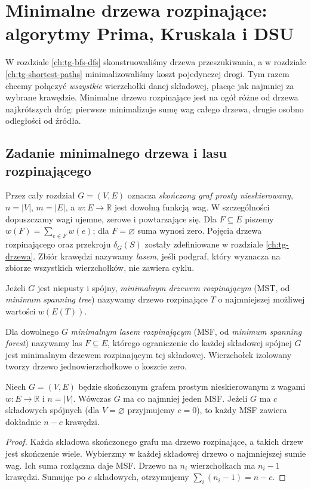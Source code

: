 \chapter{Minimalne drzewa rozpinające: algorytmy Prima, Kruskala i DSU}
\label{ch:tg-mst}

W rozdziale \ref{ch:tg-bfs-dfs} skonstruowaliśmy drzewa
przeszukiwania, a w rozdziale \ref{ch:tg-shortest-paths}
minimalizowaliśmy koszt pojedynczej drogi.
Tym razem chcemy połączyć \emph{wszystkie} wierzchołki
danej składowej, płacąc jak najmniej za wybrane krawędzie.
Minimalne drzewo rozpinające jest na ogół różne od
drzewa najkrótszych dróg: pierwsze minimalizuje sumę
wag całego drzewa, drugie osobno odległości od źródła.

\section{Zadanie minimalnego drzewa i lasu rozpinającego}
\label{sec:tg-mst-model}

Przez cały rozdział $G=(V,E)$ oznacza \emph{skończony
graf prosty nieskierowany}, $n=|V|$, $m=|E|$,
a $w\colon E\to\mathbb R$ jest dowolną funkcją wag.
W szczególności dopuszczamy wagi ujemne, zerowe i powtarzające
się. Dla $F\subseteq E$ piszemy
$w(F)=\sum_{e\in F}w(e)$; dla $F=\varnothing$ suma wynosi zero.
Pojęcia drzewa rozpinającego oraz przekroju $\delta_G(S)$
zostały zdefiniowane w rozdziale \ref{ch:tg-drzewa}.
Zbiór krawędzi nazywamy \emph{lasem}, jeśli podgraf,
który wyznacza na zbiorze wszystkich wierzchołków,
nie zawiera cyklu.

\begin{definicja}
\label{def:tg-mst}
Jeżeli $G$ jest niepusty i spójny, \emph{minimalnym drzewem
rozpinającym} (MST, od \emph{minimum spanning tree})
nazywamy drzewo rozpinające $T$ o najmniejszej
możliwej wartości $w(E(T))$.

Dla dowolnego $G$ \emph{minimalnym lasem rozpinającym}
(MSF, od \emph{minimum spanning forest}) nazywamy las
$F\subseteq E$, którego ograniczenie do każdej składowej
spójnej $G$ jest minimalnym drzewem rozpinającym
tej składowej. Wierzchołek izolowany tworzy drzewo
jednowierzchołkowe o koszcie zero.
\end{definicja}

\begin{stwierdzenie}
\label{prop:tg-mst-existence}
Niech $G=(V,E)$ będzie skończonym grafem prostym
nieskierowanym z wagami $w:E\to\mathbb R$ i $n=|V|$.
Wówczas $G$ ma co najmniej jeden MSF.
Jeżeli $G$ ma $c$ składowych spójnych (dla $V=\varnothing$
przyjmujemy $c=0$), to każdy MSF zawiera dokładnie $n-c$
krawędzi.
\end{stwierdzenie}
\begin{proof}
Każda składowa skończonego grafu ma drzewo rozpinające,
a takich drzew jest skończenie wiele.
Wybierzmy w każdej składowej drzewo o najmniejszej sumie wag.
Ich suma rozłączna daje MSF. Drzewo na $n_i$ wierzchołkach
ma $n_i-1$ krawędzi. Sumując po $c$ składowych,
otrzymujemy $\sum_i(n_i-1)=n-c$.
\end{proof}

